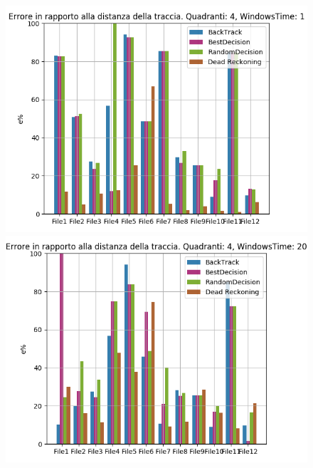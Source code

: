 \documentclass[12pt,a4paper,openright,twoside]{report}
\begin{document}
\begin{figure}[H]
\centering 
\includegraphics[scale=0.4]{firstChart4-1} 
\includegraphics[scale=0.4]{firstChart4-20} 
\end{figure}
\end{document}
